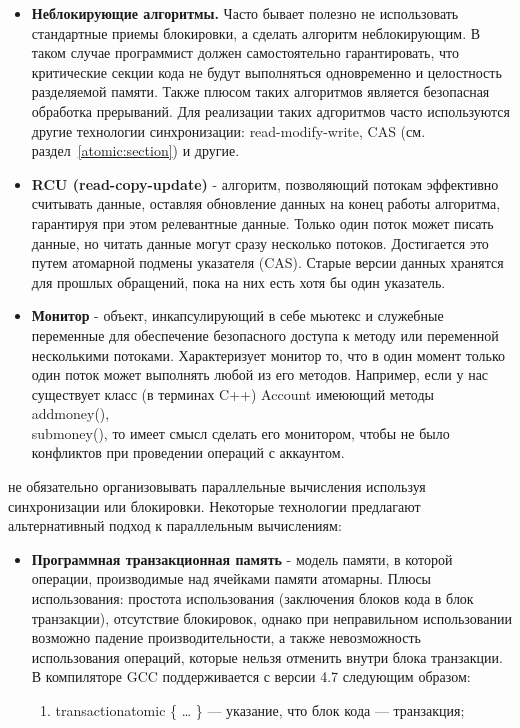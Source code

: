 {\begin{itemize}
			\item\textbf{Неблокирующие алгоритмы.} Часто бывает полезно не использовать стандартные приемы блокировки, а сделать алгоритм неблокирующим. В таком случае программист должен самостоятельно гарантировать, что критические секции кода не будут выполняться одновременно и целостность разделяемой памяти. Также плюсом таких алгоритмов является безопасная обработка прерываний. Для реализации таких адгоритмов часто используются другие технологии синхронизации: read-modify-write, CAS (см. раздел~\ref{atomic:section}) и другие.
			\item\textbf{RCU (read-copy-update)} - алгоритм, позволяющий потокам эффективно считывать данные, оставляя обновление данных на конец работы алгоритма, гарантируя при этом релевантные данные. Только один поток может писать данные, но читать данные могут сразу несколько потоков. Достигается это путем атомарной подмены указателя (CAS). Старые версии данных хранятся для прошлых обращений, пока на них есть хотя бы один указатель.
			\item\textbf{Монитор} - объект, инкапсулирующий в себе мьютекс и служебные переменные для обеспечение безопасного доступа к методу или переменной несколькими потоками. Характеризует монитор то, что в один момент только один поток может выполнять любой из его методов. Например, если у нас существует класс (в терминах C++) Account имеюющий методы add\textunderscore money(),\\sub\textunderscore money(), то имеет смысл сделать его монитором, чтобы не было конфликтов при проведении операций с аккаунтом.
		\end{itemize}
		 не обязательно организовывать параллельные вычисления используя синхронизации или блокировки. Некоторые технологии предлагают альтернативный подход к параллельным вычислениям: 
		\begin{itemize}
			\item\textbf{Программная транзакционная память} - модель памяти, в которой операции, производимые над ячейками памяти атомарны. Плюсы использования: простота использования (заключения блоков кода в блок транзакции), отсутствие блокировок, однако при неправильном использовании возможно падение производительности, а также невозможность использования операций, которые нельзя отменить внутри блока транзакции. В компиляторе GCC поддерживается с версии 4.7 следующим образом: 
				\begin{enumerate}
					\item\textunderscore \textunderscore transaction\textunderscore atomic \{ … \} — указание, что блок кода — транзакция;

\end{enumerate}
\end{itemize}}

